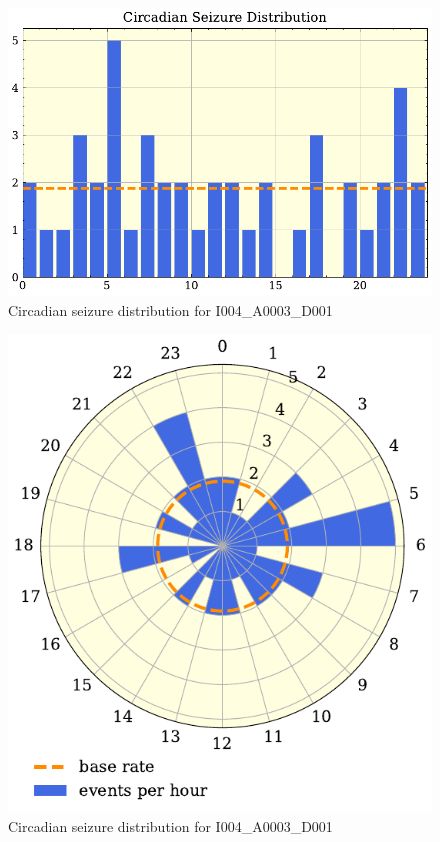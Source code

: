 

\begin{figure}[h]
    \centering
    \includegraphics{5Results/figs/prior/hist.pdf}
    \caption{Circadian seizure distribution for I004\_A0003\_D001
    }
    \label{fig:events_circadian_hist}
\end{figure}


\begin{figure}[h]
    \centering
    \includegraphics{5Results/figs/prior/polar_hist.pdf}
    \caption{Circadian seizure distribution for I004\_A0003\_D001}
    \label{fig:events_circadian_polar_hist}
\end{figure}


